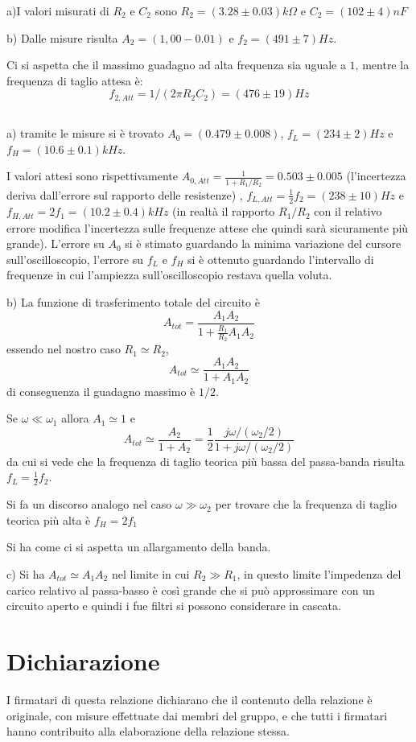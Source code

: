 \documentclass[10pt,a4paper]{article}
\begin{document}
a)I valori misurati di  $R_2$ e  $C_2$ sono $R_2  = (3.28 \pm 0.03 )k\Omega$ e  $C_2  = (102\pm 4 )nF$
\vspace{0.5cm}

b) Dalle misure risulta $A_2 = (1,00- 0.01)$ e  $f_2 = ( 491\pm 7) Hz$. 

Ci si aspetta che il massimo guadagno ad alta frequenza sia  uguale a $1$, mentre la frequenza di taglio attesa è: \[ f_{2,Att}  = 1/(2\pi R_2 C_2)= ( 476\pm 19) Hz\]
\subsection{}

a) tramite le misure si è trovato $A_0 =(0.479\pm 0.008)$, $f_L = (234\pm 2) Hz$ e $ f_{H} = (10.6\pm 0.1) kHz$.

I valori attesi sono rispettivamente $A_{0,Att} = \frac{1}{1+R_1/R_2}= 0.503\pm 0.005$ (l'incertezza deriva dall'errore sul rapporto delle resistenze) , $f_{L,Att} = \frac{1}{2}f_2= (238\pm 10) Hz$ e $ f_{H,Att}=2 f_1 = (10.2\pm 0.4) kHz$ (in realtà il rapporto $R_1/R_2$ con il relativo errore modifica l'incertezza sulle frequenze attese che quindi sarà sicuramente più grande).
L'errore su $A_0 $ si è stimato guardando la minima variazione del cursore sull'oscilloscopio, l'errore su $f_L$ e $f_H$ si è ottenuto guardando l'intervallo di frequenze in cui l'ampiezza sull'oscilloscopio restava quella voluta.
\vspace{0.5cm}


b) La funzione di trasferimento totale del circuito è \[A_{tot}= \frac{A_1A_2}{1+\frac{R_1}{R_2}A_1A_2}\]
essendo nel nostro caso $R_1 \simeq R_2$, \[A_{tot}\simeq \frac{A_1A_2}{1+A_1A_2}\] di conseguenza il guadagno massimo è $1/2$.

Se $\omega \ll \omega_1 $ allora $A_1\simeq 1 $ e \[A_{tot}\simeq \frac{A_2}{1+A_2}= \frac{1}{2}\frac{j\omega/(\omega_2/2)}{1+j\omega/(\omega_2/2)}\] da cui si vede che  la frequenza di taglio teorica più bassa del passa-banda  risulta $f_L = \frac{1}{2}f_2$.

Si fa un discorso analogo nel caso  $\omega \gg \omega_2 $ per trovare che la frequenza di taglio teorica più alta è $f_H = 2f_1$

Si ha come ci si aspetta un allargamento della banda.
\vspace{0.5cm}

c) Si ha  $A_{tot}\simeq A_1A_2$ nel limite in cui $R_2 \gg R_1$, in questo limite l'impedenza del carico relativo al passa-basso è così grande che si può approssimare con un circuito aperto e quindi i fue filtri si possono considerare in cascata.







\section*{Dichiarazione}
I firmatari di questa relazione dichiarano che il contenuto della relazione \`e originale, con misure effettuate dai membri del gruppo, e che tutti i firmatari hanno contribuito alla elaborazione della relazione stessa.
\end{document}
